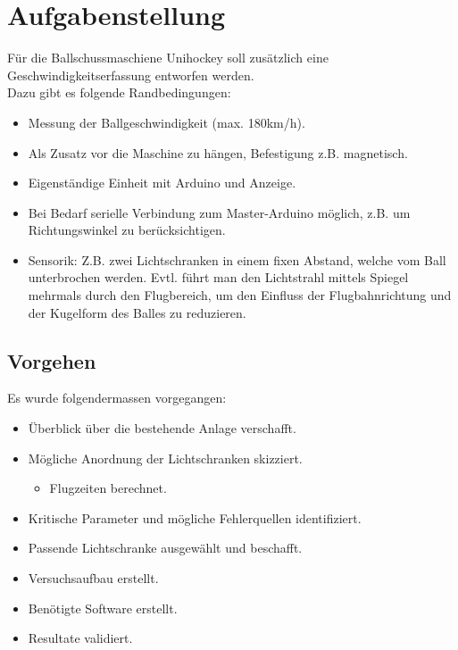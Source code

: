 \section{Aufgabenstellung}
Für die Ballschussmaschiene Unihockey soll zusätzlich eine Geschwindigkeitserfassung entworfen werden.\\

Dazu gibt es folgende Randbedingungen:
\begin{itemize}
    \item  Messung der Ballgeschwindigkeit (max. 180km/h).
    \item Als Zusatz vor die Maschine zu hängen, Befestigung z.B. magnetisch.
    \item Eigenständige Einheit mit Arduino und Anzeige. 
    \item Bei Bedarf serielle Verbindung zum Master-Arduino möglich, z.B. um Richtungswinkel zu berücksichtigen.
    \item Sensorik: Z.B. zwei Lichtschranken in einem fixen Abstand, welche vom Ball unterbrochen werden. Evtl. führt man den Lichtstrahl mittels Spiegel mehrmals durch den Flugbereich, um den Einfluss der Flugbahnrichtung und der Kugelform des Balles zu reduzieren.
\end{itemize}

\subsection{Vorgehen}
Es  wurde folgendermassen vorgegangen:
\begin{itemize}
    \item Überblick über die bestehende Anlage verschafft.
    \item Mögliche Anordnung der Lichtschranken skizziert.
    \begin{itemize}
        \item Flugzeiten berechnet.
    \end{itemize}
    \item Kritische Parameter und mögliche Fehlerquellen identifiziert.
    \item Passende Lichtschranke ausgewählt und beschafft.
    \item Versuchsaufbau erstellt.
    \item Benötigte Software erstellt.
    \item Resultate validiert.
\end{itemize}

